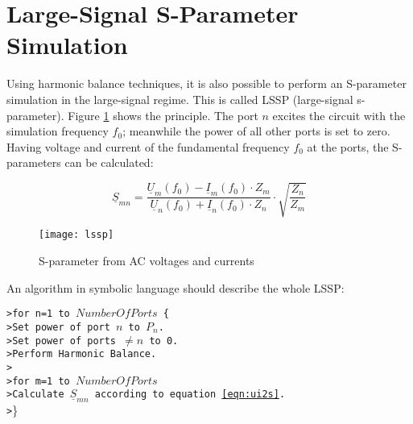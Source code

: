 \section{Large-Signal S-Parameter Simulation}

Using harmonic balance techniques, it is also possible to perform
an S-parameter simulation in the large-signal regime. This is called
LSSP (large-signal s-parameter). Figure \ref{fig:lssp} shows the
principle. The port $n$ excites the circuit with the simulation
frequency $f_0$; meanwhile the power of all other ports is set to
zero. Having voltage and current of the fundamental frequency $f_0$
at the ports, the S-parameters can be calculated:

\begin{equation}
\label{eqn:ui2s}
\underline{S}_{mn} = \frac{\underline{U}_m(f_0) - \underline{I}_m(f_0)\cdot Z_m}
                          {\underline{U}_n(f_0) + \underline{I}_n(f_0)\cdot Z_n}
		\cdot \sqrt{\frac{Z_n}{Z_m}}
\end{equation}

\begin{figure}[htb]
\begin{center}
\texttt{[image: lssp]}
\end{center}
\caption{S-parameter from AC voltages and currents}
\label{fig:lssp}
\end{figure}
\FloatBarrier

An algorithm in symbolic language should describe the whole LSSP:

\addvspace{12pt}

\texttt{>\quad for n=1 to $NumberOfPorts$ \{} \\
\texttt{>\quad \qquad Set power of port $n$ to $P_n$.} \\
\texttt{>\quad \qquad Set power of ports $\ne n$ to 0.} \\
\texttt{>\quad \qquad Perform Harmonic Balance.} \\
\texttt{>\quad \qquad } \\
\texttt{>\quad \qquad for m=1 to $NumberOfPorts$} \\
\texttt{>\quad \qquad \qquad Calculate $\underline{S}_{mn}$ according to equation \ref{eqn:ui2s}.} \\
\texttt{>\quad }\} \\
